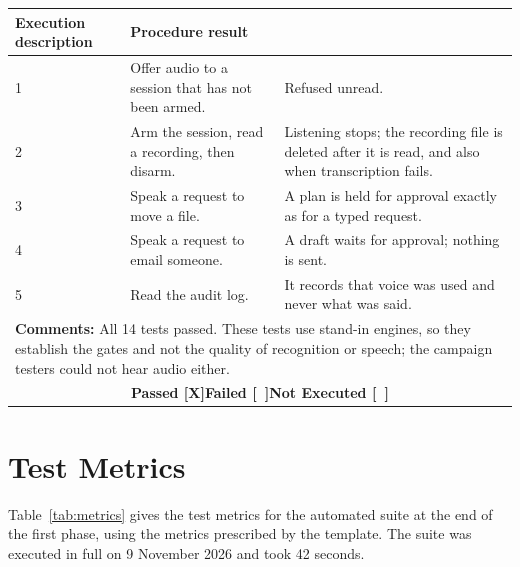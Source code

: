 \documentclass{FastFyp}
\begin{document}
{\begin{longtable}{|p{2.4cm}p{5.0cm}p{2.4cm}p{3.8cm}|}
  \multicolumn{1}{p{5.0cm}|}{\textbf{Execution description}} &
  \multicolumn{2}{p{6.6cm}|}{\textbf{Procedure result}} \\ \hline
\multicolumn{1}{|p{2.4cm}|}{1} & \multicolumn{1}{p{5.0cm}|}{Offer audio to a session that has not been armed.} & \multicolumn{2}{p{6.6cm}|}{Refused unread.} \\ \hline
\multicolumn{1}{|p{2.4cm}|}{2} & \multicolumn{1}{p{5.0cm}|}{Arm the session, read a recording, then disarm.} & \multicolumn{2}{p{6.6cm}|}{Listening stops; the recording file is deleted after it is read, and also when transcription fails.} \\ \hline
\multicolumn{1}{|p{2.4cm}|}{3} & \multicolumn{1}{p{5.0cm}|}{Speak a request to move a file.} & \multicolumn{2}{p{6.6cm}|}{A plan is held for approval exactly as for a typed request.} \\ \hline
\multicolumn{1}{|p{2.4cm}|}{4} & \multicolumn{1}{p{5.0cm}|}{Speak a request to email someone.} & \multicolumn{2}{p{6.6cm}|}{A draft waits for approval; nothing is sent.} \\ \hline
\multicolumn{1}{|p{2.4cm}|}{5} & \multicolumn{1}{p{5.0cm}|}{Read the audit log.} & \multicolumn{2}{p{6.6cm}|}{It records that voice was used and never what was said.} \\ \hline
\multicolumn{4}{|p{14.8cm}|}{\textbf{Comments:} All 14 tests passed. These tests use stand-in engines, so they establish the gates and not the quality of recognition or speech; the campaign testers could not hear audio either.} \\ \hline
\multicolumn{4}{|c|}{\textbf{Passed [X]\quad Failed [\ ]\quad Not Executed [\ ]}} \\ \hline
\end{longtable}
}


\section{Test Metrics}
Table~\ref{tab:metrics} gives the test metrics for the automated suite at the end of the first phase, using the metrics prescribed by the template. The suite was executed in full on 9 November 2026 and took 42 seconds.
\end{document}
